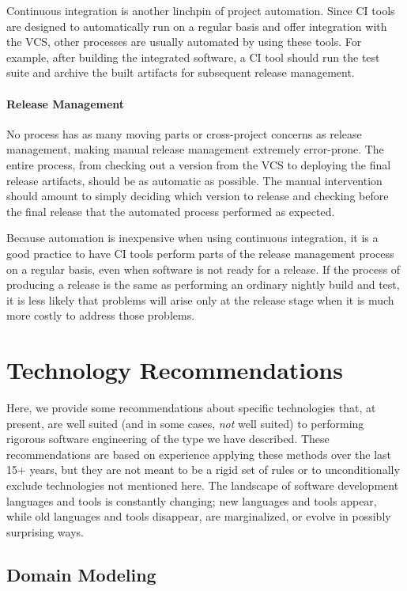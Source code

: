 Continuous integration is another linchpin of project
automation. Since CI tools are designed to automatically run on a
regular basis and offer integration with the VCS, other processes are
usually automated by using these tools. For example, after building
the integrated software, a CI tool should run the test suite and
archive the built artifacts for subsequent release management.

\paragraph{Release Management}

No process has as many moving parts or cross-project concerns as
release management, making manual release management extremely
error-prone. The entire process, from checking out a version from the
VCS to deploying the final release artifacts, should be as automatic
as possible. The manual intervention should amount to simply deciding
which version to release and checking before the final release that
the automated process performed as expected.

Because automation is inexpensive when using continuous integration,
it is a good practice to have CI tools perform parts of the release
management process on a regular basis, even when software is not ready
for a release. If the process of producing a release is the same as
performing an ordinary nightly build and test, it is less likely that
problems will arise only at the release stage when it is much more
costly to address those problems.

\section{Technology Recommendations}
\label{sec:technologies}

Here, we provide some recommendations about specific technologies
that, at present, are well suited (and in some cases, \emph{not} well
suited) to performing rigorous software engineering of the type we
have described. These recommendations are based on experience applying
these methods over the last 15+ years, but they are not meant to be a
rigid set of rules or to unconditionally exclude technologies not
mentioned here. The landscape of software development languages and
tools is constantly changing; new languages and tools appear, while
old languages and tools disappear, are marginalized, or evolve in
possibly surprising ways.

\subsection{Domain Modeling}


